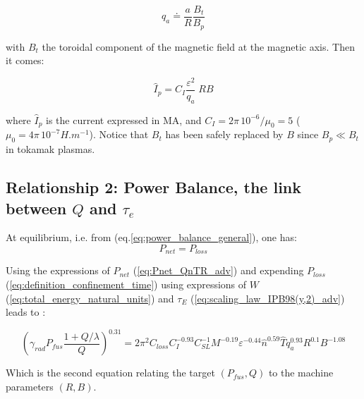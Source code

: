 \begin{equation*}
q_a \doteq \frac{a}{R} \frac{B_t}{B_p} 
\end{equation*}

\noindent
with $B_t$ the toroidal component of the magnetic field at the magnetic axis. Then it comes:

\begin{equation}
\hat I_p = C_I \frac{\varepsilon^2}{q_a} \; R B
\label{eq:plasma_current_adv}
\end{equation}

\noindent
where $\hat I_p$ is the current expressed in MA, and $C_I = 2\pi\, 10^{-6} /\mu_0 = 5$  ($\mu_0 = 4\pi\, 10^{-7} \si{H.m^{-1}}$).
Notice that $B_t$ has been safely replaced by $B$ since $B_p\ll B_t$ in tokamak plasmas. 

\subsection{Relationship 2: Power Balance, the link between $Q$ and $\tau_e$}
At equilibrium, i.e. from (eq.\ref{eq:power_balance_general}), one has:
\begin{equation}
	P_{net} = P_{loss}
\end{equation}

Using the expressions of $P_{net}$ (\ref{eq:Pnet_QnTR_adv}) and expending $P_{loss}$ (\ref{eq:definition_confinement_time}) using expressions of $W$ (\ref{eq:total_energy_natural_units}) and $\tau_E$ (\ref{eq:scaling_law_IPB98(y,2)_adv}) leads to
:

\begin{equation}
	\left(
		\gamma_{rad} P_{fus} \frac{1 + Q/\lambda}{Q}
	\right)^{0.31}
	=
	2\pi^2 C_{loss}  C_I^{-0.93} C_{SL}^{-1}
	M^{-0.19} \varepsilon^{-0.44}
  \hat n^{0.59} \hat T  q_a^{0.93} R^{0.1} B^{-1.08} 
\end{equation}

Which is the second equation relating the target $(P_{fus}, Q)$ to the machine parameters $(R,B)$. 

